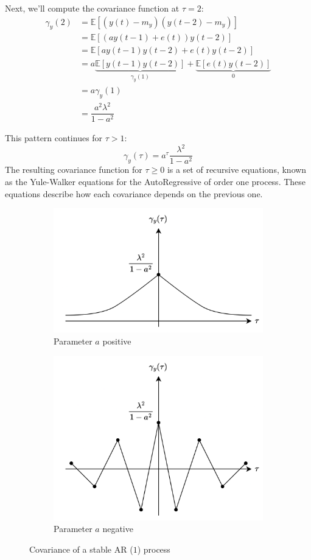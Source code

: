 Next, we'll compute the covariance function at $\tau=2$:
\begin{align*}
    \gamma_y(2) &=\mathbb{E}\left[ \left(y(t)-m_y\right)\left(y(t-2)-m_y\right) \right] \\
                &=\mathbb{E}\left[ \left(ay(t-1)+e(t)\right)y(t-2) \right] \\
                &=\mathbb{E}\left[ ay(t-1)y(t-2)+e(t)y(t-2) \right] \\     
                &=a\underbrace{\mathbb{E}\left[ y(t-1)y(t-2)\right]}_{\gamma_y(1)} +\underbrace{\mathbb{E}\left[e(t)y(t-2) \right]}_0  \\  
                &=a\gamma_y(1) \\                 
                &=\dfrac{a^2\lambda^2}{1-a^2}
\end{align*}

This pattern continues for $\tau > 1$:
\[\gamma_y(\tau)=a^\tau\dfrac{\lambda^2}{1-a^2}\]
The resulting covariance function for $\tau \geq 0$ is a set of recursive equations, known as the Yule-Walker equations for the AutoRegressive of order one process. 
These equations describe how each covariance depends on the previous one.
\begin{figure}[H]
    \centering
    \begin{subfigure}{0.49\textwidth}
        \centering
        \includegraphics[width=0.85\linewidth]{images/ar1.png} 
        \caption{Parameter $a$ positive}
    \end{subfigure}
    \begin{subfigure}{0.49\textwidth}
        \centering
        \includegraphics[width=0.75\linewidth]{images/ar2.png}
        \caption{Parameter $a$ negative}
    \end{subfigure}
    \caption{Covariance of a stable AR ($1$) process}
\end{figure}

